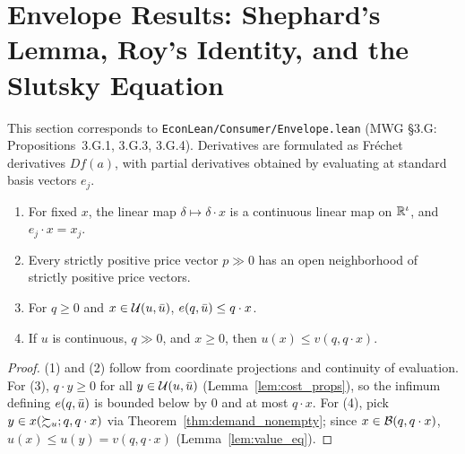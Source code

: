 \section{Envelope Results: Shephard's Lemma, Roy's Identity, and the Slutsky Equation}
\label{sec:envelope}

This section corresponds to \texttt{EconLean/Consumer/Envelope.lean} (MWG \S3.G:
Propositions~3.G.1, 3.G.3, 3.G.4). Derivatives are formulated as Fr\'echet derivatives
$Df(a)$, with partial derivatives obtained by evaluating at standard basis vectors $e_j$.

\begin{lemma}
\label{lem:envelope_helpers}
\leanok
{}
\begin{enumerate}
  \item For fixed $x$, the linear map $\delta \mapsto \delta \cdot x$ is a continuous linear
        map on $\mathbb{R}^\iota$, and $e_j \cdot x = x_j$.
  \item Every strictly positive price vector $p \gg 0$ has an open neighborhood of strictly
        positive price vectors.
  \item For $q \ge 0$ and $x \in \mathcal{U}(u, \bar{u})$, $e(q, \bar{u}) \le q \cdot x$.
  \item If $u$ is continuous, $q \gg 0$, and $x \ge 0$, then $u(x) \le v(q, q \cdot x)$.
\end{enumerate}
\end{lemma}
\begin{proof}
\leanok
(1) and (2) follow from coordinate projections and continuity of evaluation.
For (3), $q \cdot y \ge 0$ for all $y \in \mathcal{U}(u, \bar{u})$ (Lemma~\ref{lem:cost_props}),
so the infimum defining $e(q, \bar{u})$ is bounded below by $0$ and at most $q \cdot x$.
For (4), pick $y \in x(\succsim_u; q, q \cdot x)$ via Theorem~\ref{thm:demand_nonempty};
since $x \in \mathcal{B}(q, q \cdot x)$, $u(x) \le u(y) = v(q, q \cdot x)$ (Lemma~\ref{lem:value_eq}).
\end{proof}

